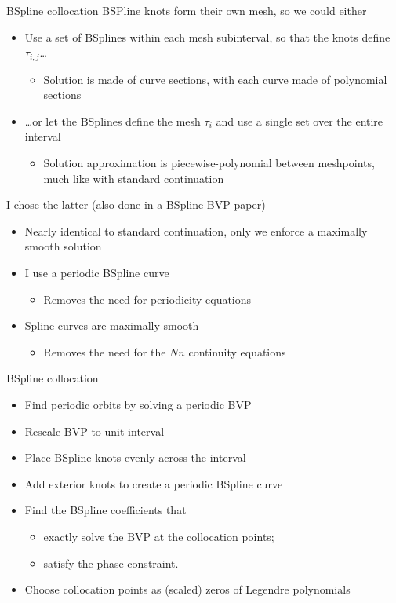 \documentclass[presentation]{beamer}
\begin{document}
\begin{frame}[label={sec:org97d3016},plain]{BSpline collocation}
BSPline knots form their own mesh, so we could either
\begin{itemize}
\item Use a set of BSplines within each mesh subinterval, so that the knots define \(\tau_{i,j}\)\ldots{}
\begin{itemize}
\item Solution is made of curve sections, with each curve made of polynomial sections
\end{itemize}
\item \ldots{}or let the BSplines define the mesh \(\tau_i\) and use a single set over the entire interval
\begin{itemize}
\item Solution approximation is piecewise-polynomial between meshpoints, much like with standard continuation
\end{itemize}
\end{itemize}
\vfill
I chose the latter (also done in a BSpline BVP paper)
\begin{itemize}
\item Nearly identical to standard continuation, only we enforce a maximally smooth solution
\item I use a periodic BSpline curve
\begin{itemize}
\item Removes the need for periodicity equations
\end{itemize}
\item Spline curves are maximally smooth
\begin{itemize}
\item Removes the need for the \(Nn\) continuity equations
\end{itemize}
\end{itemize}
\end{frame}

\begin{frame}[label={sec:org07b6c6b}]{BSpline collocation}
\begin{itemize}
\item Find periodic orbits by solving a periodic BVP
\item Rescale BVP to unit interval
\item Place BSpline knots evenly across the interval
\item Add exterior knots to create a periodic BSpline curve
\item Find the BSpline coefficients that
\begin{itemize}
\item exactly solve the BVP at the collocation points;
\item satisfy the phase constraint.
\end{itemize}
\item Choose collocation points as (scaled) zeros of Legendre polynomials
\end{itemize}
\end{frame}
\end{document}
